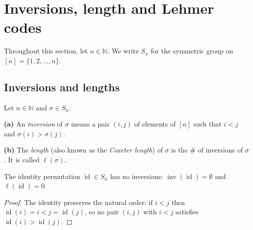 \section{Inversions, length and Lehmer codes}

Throughout this section, let $n \in \mathbb{N}$.
We write $S_n$ for the symmetric group on $[n] = \{1,2,\ldots,n\}$.

\subsection{Inversions and lengths}

\begin{definition}
\label{def.perm.invs}
\leantarget
\leanok
Let $n\in\mathbb{N}$ and $\sigma\in S_{n}$. \medskip

\textbf{(a)} An \emph{inversion} of $\sigma$ means a pair $\left(i,j\right)$
of elements of $\left[n\right]$ such that $i<j$ and $\sigma\left(i\right)
>\sigma\left(j\right)$. \medskip

\textbf{(b)} The \emph{length} (also known as the \emph{Coxeter length}) of
$\sigma$ is the \# of inversions of $\sigma$. It is called $\ell\left(
\sigma\right)$.
\end{definition}

\begin{lemma}
\label{lem.perm.inv_one}
\leanhelper
\leanok
The identity permutation $\operatorname{id} \in S_n$ has no inversions:
$\operatorname{inv}(\operatorname{id}) = \emptyset$ and $\ell(\operatorname{id}) = 0$.
\end{lemma}

\begin{proof}
\leanok
The identity preserves the natural order: if $i < j$ then $\operatorname{id}(i) = i < j = \operatorname{id}(j)$,
so no pair $(i,j)$ with $i < j$ satisfies $\operatorname{id}(i) > \operatorname{id}(j)$.
\end{proof}

